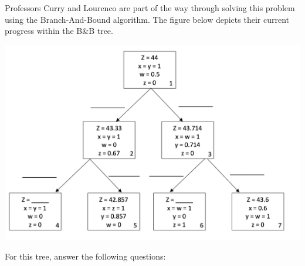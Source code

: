 \documentclass[12pt]{exam}
\begin{document}
\begin{questions}
Professors Curry and Lourenco are part of the way through solving this problem using the Branch-And-Bound algorithm. The figure below depicts their current progress within the B\&B tree. 

    \begin{center}
        
    \includegraphics[width = .8\textwidth]{bandbfigure.png}
\end{center}
    
    
For this tree, answer the following questions:



\end{questions}
\end{document}
